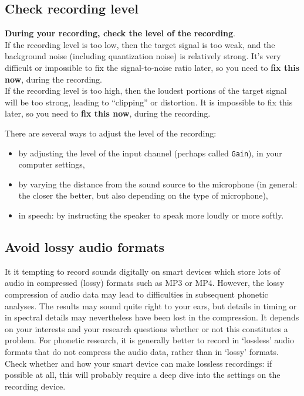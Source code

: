 \documentclass[
]{book}
\begin{document}
\subsection{Check recording level}\label{sec:recordinglevel}

\textbf{During your recording, check the level of the recording}.\\
If the recording level is too low, then the target signal is too weak, and the background noise (including quantization noise) is relatively strong. It's very difficult or impossible to fix the signal-to-noise ratio later, so you need to \textbf{fix this now}, during the recording.\\
If the recording level is too high, then the loudest portions of the target signal will be too strong, leading to ``clipping'' or distortion. It is impossible to fix this later, so you need to \textbf{fix this now}, during the recording.

There are several ways to adjust the level of the recording:

\begin{itemize}
\item
  by adjusting the level of the input channel (perhaps called \texttt{Gain}), in your computer settings,
\item
  by varying the distance from the sound source to the microphone (in general: the closer the better, but also depending on the type of microphone),
\item
  in speech: by instructing the speaker to speak more loudly or more softly.
\end{itemize}

\subsection{Avoid lossy audio formats}\label{sec:avoidlossyformats}

It it tempting to record sounds digitally on smart devices which store lots of audio in compressed (lossy) formats such as MP3 or MP4. However, the lossy compression of audio data may lead to difficulties in subsequent phonetic analyses. The results may sound quite right to your ears, but details in timing or in spectral details may nevertheless have been lost in the compression. It depends on your interests and your research questions whether or not this constitutes a problem.
For phonetic research, it is generally better to record in `lossless' audio formats that do not compress the audio data, rather than in `lossy' formats. Check whether and how your smart device can make lossless recordings: if possible at all, this will probably require a deep dive into the settings on the recording device.
\end{document}
